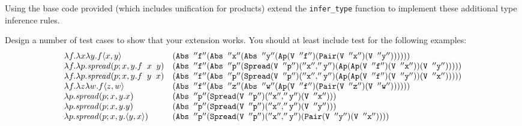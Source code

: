 \documentclass[11pt]{article}
\begin{document}
\begin{exercise}
Using the base code provided (which includes unification for products) extend
the {\tt{infer\_type}} function to implement these additional type inference
rules.
\end{exercise}


\begin{exercise}
Design a number of test cases to show that your extension works.  You should at least include test for the following examples:
\[\begin{array}{ll}
\lambda{}f.\lambda{}x\lambda{}y.f{\langle{x,y}\rangle} & {\tt{(Abs \;\;''f'' (Abs \;\;''x'' (Abs \;\;''y'' (Ap (V \;\;''f'') (Pair (V \;\;''x'') (V \;\;''y''))))))}} \\
\lambda{}f.\lambda{}p.{\mathit{spread}({p};{x,y}.{f\;\; x\;\; y})} & {\tt{(Abs \;\;''f'' (Abs \;\;''p'' (Spread (V \;\;''p'') (''x'',''y'') (Ap (Ap (V \;\;''f'') (V \;\;''x''))  (V \;\;''y'')))))}} \\
\lambda{}f.\lambda{}p.{\mathit{spread}({p};{x,y}.{f\;\; y\;\; x})} & {\tt{(Abs \;\;''f'' (Abs \;\;''p'' (Spread (V \;\;''p'') (''x'',''y'') (Ap (Ap (V \;\;''f'') (V \;\;''y''))  (V \;\;''x'')))))}} \\
\lambda{}f.\lambda{}z\lambda{}w.f{\langle{z,w}\rangle}  & {\tt{(Abs \;\;''f'' (Abs \;\;''z'' (Abs \;\;''w'' (Ap  (V \;\;''f'') (Pair (V \;\;''z'') (V \;\;''w''))))))}} \\
\lambda{}p.{\mathit{spread}({p};{x,y}.{x})} & {\tt{(Abs \;\;''p'' (Spread (V \;\;''p'') (''x'',''y'') (V \;\;''x'')))}} \\
\lambda{}p.{\mathit{spread}({p};{x,y}.{y})} & {\tt{(Abs \;\;''p'' (Spread (V \;\;''p'') (''x'',''y'') (V \;\;''y'')))}} \\
\lambda{}p.{\mathit{spread}({p};{x,y}.{{\langle{y,x}\rangle}})} &{\tt{(Abs \;\;''p'' (Spread (V \;\;''p'') (''x'',''y'') (Pair (V \;\;''y'')(V \;\;''x''))))}}\\
\end{array}\]

\end{exercise}
\end{document}
